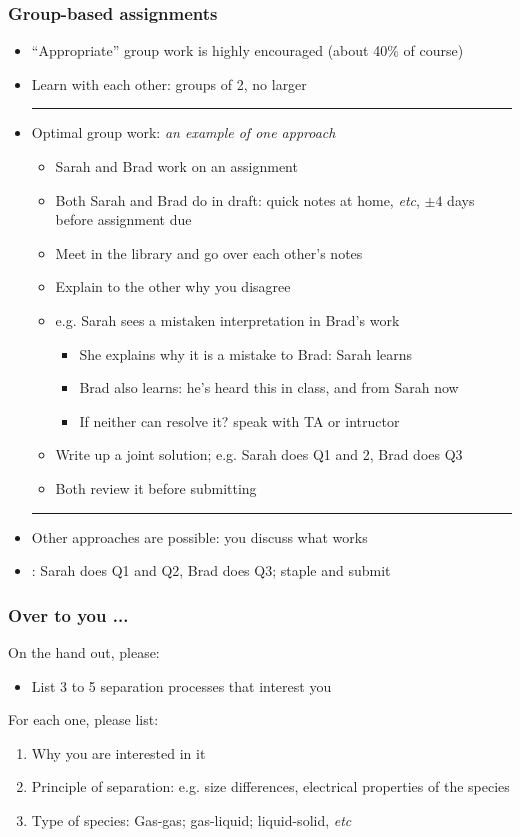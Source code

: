 \begin{frame}\frametitle{Group-based assignments}
	\begin{itemize}
		\item	``Appropriate'' group work is highly encouraged (about 40\% of course)
		\item	Learn with each other: groups of 2, no larger
		\hrule
		\item	Optimal group work: \emph{an example of one approach}
			\begin{itemize}
				\item	Sarah and Brad work on an assignment
				\item	Both Sarah and Brad do {} in draft: quick notes at home, \emph{etc}, $\pm 4$ days before assignment due
				\item	Meet in the library and go over each other's notes
				\item	Explain to the other why you disagree
				\item	e.g. Sarah sees a mistaken interpretation in Brad's work
				\begin{itemize}
					\item	She explains why it is a mistake to Brad: Sarah learns
					\item	Brad also learns: he's heard this in class, and from Sarah now
					\item	If neither can resolve it? speak with TA or intructor					
				\end{itemize}
				\item	Write up a joint solution; e.g. Sarah does Q1 and 2, Brad does Q3
				\item	Both review it before submitting
			\end{itemize}
		\hrule
		\item	Other approaches are possible: you discuss what works
		\item	\color{myOrange}{What doesn't work}: Sarah does Q1 and Q2, Brad does Q3; staple and submit
	\end{itemize}
\end{frame}

\begin{frame}\frametitle{Over to you ...}
	On the hand out, please:
	\begin{itemize}
		\item	List 3 to 5 separation processes that interest you
	\end{itemize}
	\vspace{12pt}
	For each one, please list:
	\begin{enumerate}
		\item	Why you are interested in it
		\item	Principle of separation: e.g. size differences, electrical properties of the species
		\item	Type of species: Gas-gas; gas-liquid; liquid-solid, \emph{etc}
	\end{enumerate}
\end{frame}